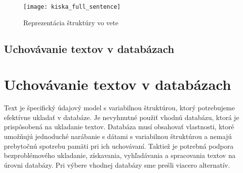 \begin{figure}[H]
	\begin{center}\texttt{[image: kiska\_full\_sentence]}\end{center}
	\caption[Reprezentácia štruktúry vo vete]{Reprezentácia štruktúry vo vete}\label{fig:sentence_representation}
\end{figure}

%
%
{
	\subsection{Uchovávanie textov v databázach}
}
{
	\section{Uchovávanie textov v databázach}
}
\label{subsection:persisting_texts_in_db}
Text je špecifický údajový model s variabilnou štruktúrou, ktorý potrebujeme efektívne ukladať v databáze. Je nevyhnutné použiť vhodnú databázu, ktorá je prispôsobená na ukladanie textov. Databáza musí obsahovať vlastnosti, ktoré umožňujú jednoduché narábanie s dátami s variabilnou štruktúrou a nemajú prebytočnú spotrebu pamäti pri ich uchovávaní. Taktiež je potrebná podpora bezproblémového ukladanie, získavania, vyhľadávania a spracovania textov na úrovni databázy. Pri výbere vhodnej databázy sme prešli viacero alternatív.

